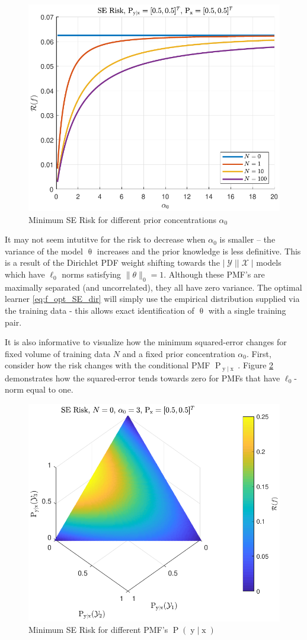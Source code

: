 \documentclass[12pt]{article}
\DeclareMathOperator{\xrm}{\mathrm{x}}
\DeclareMathOperator{\yrm}{\mathrm{y}}
\DeclareMathOperator{\Prm}{\mathrm{P}}
\DeclareMathOperator{\Xcal}{\mathcal{X}}
\DeclareMathOperator{\Ycal}{\mathcal{Y}}
\begin{document}
\begin{figure}
\centering
\includegraphics[width=0.7\linewidth]{Risk_SE_Dir_IO_a0_leg_N.pdf}
\caption{Minimum SE Risk for different prior concentrations $\alpha_0$}
\label{fig:Risk_SE_Dir_IO_a0_leg_N}
\end{figure}

It may not seem intutitve for the risk to decrease when $\alpha_0$ is smaller -- the variance of the model $\uptheta$ increases and the prior knowledge is less definitive. This is a result of the Dirichlet PDF weight shifting towards the $|\Ycal||\Xcal|$ models which have $\ell_0$ norms satisfying $\| \theta \|_0 = 1$. Although these PMF's are maximally separated (and uncorrelated), they all have zero variance. The optimal learner \eqref{eq:f_opt_SE_dir} will simply use the empirical distribution supplied via the training data - this allows exact identification of $\uptheta$ with a single training pair.

It is also informative to visualize how the minimum squared-error changes for fixed volume of training data $N$ and a fixed prior concentration $\alpha_0$. First, consider how the risk changes with the conditional PMF $\Prm_{\yrm | \xrm}$. Figure \ref{fig:Risk_SE_Dir_IO_Pyx} demonstrates how the squared-error tends towards zero for PMFs that have $\ell_0$-norm equal to one.
\begin{figure}
\centering
\includegraphics[width=0.7\linewidth]{Risk_SE_Dir_IO_Pyx.pdf}
\caption{Minimum SE Risk for different PMF's $\Prm(\yrm | \xrm)$}
\label{fig:Risk_SE_Dir_IO_Pyx}
\end{figure}
\end{document}
